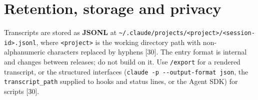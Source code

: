 \documentclass[11pt,a4paper,twoside,openany]{book}
\begin{document}
\FloatBarrier
\setcounter{section}{2}
\section{Retention, storage and privacy}

Transcripts are stored as \textbf{JSONL} at \texttt{\textasciitilde{}/\allowbreak{}.\allowbreak{}claude/\allowbreak{}projects/\allowbreak{}<project>/\allowbreak{}<session-\allowbreak{}id>.\allowbreak{}jsonl}, where \texttt{<project>} is the working directory path with non-alphanumeric characters replaced by hyphens [30]. The entry format is internal and changes between releases; do not build on it. Use \texttt{/\allowbreak{}export} for a rendered transcript, or the structured interfaces (\texttt{claude -\allowbreak{}p -\allowbreak{}-\allowbreak{}output-\allowbreak{}format json}, the \texttt{transcript\_\allowbreak{}path} supplied to hooks and status lines, or the Agent SDK) for scripts [30].
\end{document}
